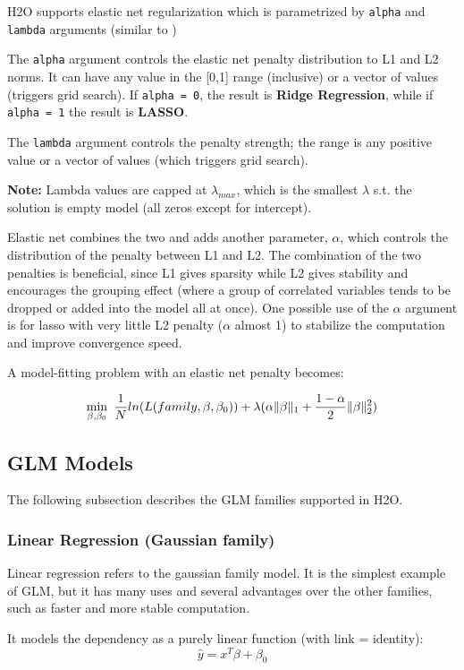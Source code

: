 \documentclass{article}[11pt]
\begin{document}
H2O supports elastic net regularization which is parametrized by \texttt{alpha} and \texttt{lambda} arguments (similar to )

The \texttt{alpha} argument controls the elastic net penalty distribution to L1 and L2 norms. It can have any value in the [0,1] range (inclusive) or a vector of values (triggers grid search). If \texttt{alpha = 0}, the result is \textbf{Ridge Regression}, while if \texttt{alpha = 1} the result is \textbf{LASSO}.  

The \texttt{lambda} argument controls the penalty strength; the range is any positive value or a vector of values (which triggers grid search).

\textbf{Note:} Lambda values are capped at $\lambda_{max}$, which is the smallest $\lambda$ s.t. the solution is empty model (all zeros except for intercept).

Elastic net combines the two and adds another parameter, $\alpha$, which controls the distribution of the penalty between L1 and L2. The combination of the two penalties is beneficial, since L1 gives sparsity while L2 gives stability and encourages the grouping effect (where a group of correlated variables tends to be dropped or added into the model all at once). One possible use of the $\alpha$ argument is for lasso with very little L2 penalty ($\alpha$ almost 1) to stabilize the computation and improve convergence speed. 

A model-fitting problem with an elastic net penalty becomes:

\[ \min\limits_{\beta,\beta_0}\ {{1\over{N}} ln(L(family,\beta,\beta_0))  + \lambda (\alpha \| \beta \|_1}  + {1- \alpha \over 2} \| \beta \|_2^2) \]


\subsection{GLM Models} 
The following subsection describes the GLM families supported in H2O. 

\subsubsection{Linear Regression (Gaussian family) }
Linear regression refers to the gaussian family model. It is the simplest example of GLM, but it has many uses and several advantages over the other families, such as faster and more stable computation. 

It models the dependency as a purely linear function (with link = identity):
\[ \hat{y} = x^T\beta + \beta_0\]
\end{document}
